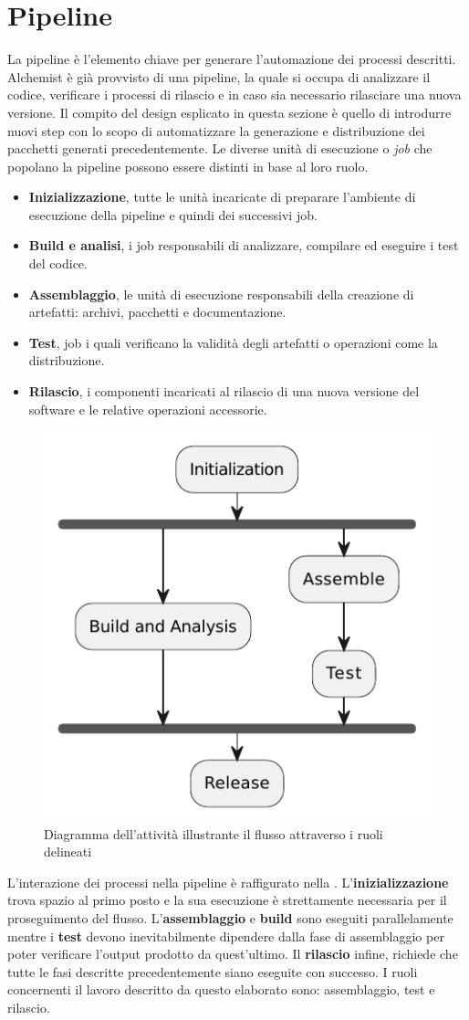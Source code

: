 \section{Pipeline}
La pipeline è l'elemento chiave per generare l'automazione dei processi descritti. Alchemist è già provvisto di una pipeline, la quale si occupa di analizzare il codice, verificare i processi di rilascio e in caso sia necessario rilasciare una nuova versione. Il compito del design esplicato in questa sezione è quello di introdurre nuovi step con lo scopo di automatizzare la generazione e distribuzione dei pacchetti generati precedentemente. Le diverse unità di esecuzione o \textit{job} che popolano la pipeline possono essere distinti in base al loro ruolo.
\begin{itemize}
	\item \textbf{Inizializzazione}, tutte le unità incaricate di preparare l'ambiente di esecuzione della pipeline e quindi dei successivi job. 
	\item \textbf{Build e analisi}, i job responsabili di analizzare, compilare ed eseguire i test del codice.
	\item \textbf{Assemblaggio}, le unità di esecuzione responsabili della creazione di artefatti: archivi, pacchetti e documentazione.
	\item \textbf{Test}, job i quali verificano la validità degli artefatti o operazioni come la distribuzione.
	\item \textbf{Rilascio}, i componenti incaricati al rilascio di una nuova versione del software e le relative operazioni accessorie.
\end{itemize}
\begin{figure}[htb]
	\centering
	\includegraphics[width=.5\linewidth]{figures/pipeline-roles.pdf}
	\caption{Diagramma dell'attività illustrante il flusso attraverso i ruoli delineati}
	\label{fig:workflow-roles-summary}
\end{figure}
L'interazione dei processi nella pipeline è raffigurato nella . L'\textbf{inizializza\-zio\-ne} trova spazio al primo posto e la sua esecuzione è strettamente necessaria per il proseguimento del flusso. L'\textbf{assemblaggio} e \textbf{build} sono eseguiti parallelamente mentre i \textbf{test} devono inevitabilmente dipendere dalla fase di assemblaggio per poter verificare l'output prodotto da quest'ultimo. Il \textbf{rilascio} infine, richiede che tutte le fasi descritte precedentemente siano eseguite con successo. I ruoli concernenti il lavoro descritto da questo elaborato sono: assemblaggio, test e rilascio.

